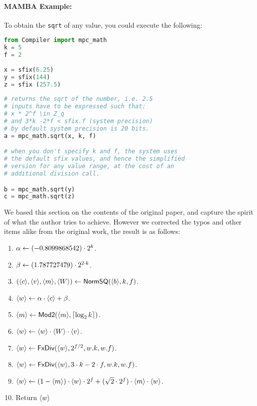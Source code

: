 \paragraph{MAMBA Example:} To obtain the \verb|sqrt| of any value, you could execute the following:
\begin{lstlisting}[language={python}]
from Compiler import mpc_math
k = 5
f = 2
 
x = sfix(6.25)
y = sfix(144)
z = sfix (257.5)
 
# returns the sqrt of the number, i.e. 2.5
# inputs have to be expressed such that:
# x * 2^f \in Z_q
# and 3*k -2*f < sfix.f (system precision)
# by default system precision is 20 bits. 
a = mpc_math.sqrt(x, k, f)

# when you don't specify k and f, the system uses
# the default sfix values, and hence the simplified
# version for any value range, at the cost of an
# additional division call.

b = mpc_math.sqrt(y)
c = mpc_math.sqrt(z)

\end{lstlisting}

We based this section on the contents of the original paper, and capture the spirit of what the author tries to achieve. However we corrected the typos and other items alike from the original work, the result is as follows:
\begin{enumerate}
\item $\alpha \leftarrow (-0.8099868542) \cdot 2^k$.  
\item $\beta \leftarrow (1.787727479) \cdot 2^{2\cdot k}$.
\item $(\langle c \rangle,\langle v \rangle,\langle m \rangle,\langle W \rangle) \leftarrow \mathsf{NormSQ}(\langle b \rangle,k,f)$.
\item $\langle w \rangle \leftarrow \alpha \cdot \langle c \rangle+\beta$.
\item $\langle m \rangle \leftarrow \mathsf{Mod2}(\langle m \rangle,{\lceil \log_2 k \rceil})$.
\item $\langle w \rangle \leftarrow \langle w \rangle \cdot \langle W \rangle \cdot \langle v \rangle$.
\item $\langle w \rangle \leftarrow \mathsf{FxDiv}(\langle w \rangle,2^{f/2},w.k,w.f)$.
\item $\langle w \rangle \leftarrow \mathsf{FxDiv}(\langle w \rangle,3 \cdot k - 2 \cdot f,w.k,w.f)$.
\item $\langle w \rangle \leftarrow (1-\langle m \rangle) \cdot \langle w \rangle \cdot 2^f
			+(\sqrt{2} \cdot 2^f) \cdot \langle m \rangle\cdot \langle w \rangle$.
\item Return $\langle w \rangle$ %
\end{enumerate}

